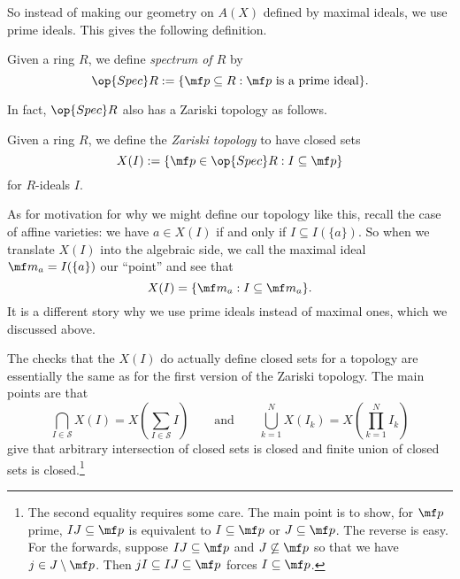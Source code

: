 \documentclass[../notes.tex]{subfiles}
\begin{document}
So instead of making our geometry on $A(X)$ defined by maximal ideals, we use prime ideals. This gives the following definition.
\begin{definition}
	Given a ring $R$, we define \textit{spectrum of $R$} by
	\[\op{Spec}R:=\{\mf p\subseteq R:\mf p\text{ is a prime ideal}\}.\]
\end{definition}
In fact, $\op{Spec}R$ also has a Zariski topology as follows.
\begin{definition}
	Given a ring $R$, we define the \textit{Zariski topology} to have closed sets
	\[X(I):=\{\mf p\in\op{Spec}R:I\subseteq\mf p\}\]
	for $R$-ideals $I$.
\end{definition}
\begin{remark}[Nir]
	As for motivation for why we might define our topology like this, recall the case of affine varieties: we have $a\in X(I)$ if and only if $I\subseteq I(\{a\})$. So when we translate $X(I)$ into the algebraic side, we call the maximal ideal $\mf m_a=I(\{a\})$ our ``point'' and see that
	\[X(I)=\{\mf m_a:I\subseteq\mf m_a\}.\]
	It is a different story why we use prime ideals instead of maximal ones, which we discussed above.
\end{remark}
The checks that the $X(I)$ do actually define closed sets for a topology are essentially the same as for the first version of the Zariski topology. The main points are that
\[\bigcap_{I\in\mathcal S}X(I)=X\left(\sum_{I\in\mathcal S}I\right)\qquad\text{and}\qquad\bigcup_{k=1}^NX(I_k)=X\left(\prod_{k=1}^NI_k\right)\]
give that arbitrary intersection of closed sets is closed and finite union of closed sets is closed.\footnote{The second equality requires some care. The main point is to show, for $\mf p$ prime, $IJ\subseteq\mf p$ is equivalent to $I\subseteq\mf p$ or $J\subseteq\mf p$. The reverse is easy. For the forwards, suppose $IJ\subseteq\mf p$ and $J\not\subseteq\mf p$ so that we have $j\in J\setminus\mf p$. Then $jI\subseteq IJ\subseteq\mf p$ forces $I\subseteq\mf p$.}
\end{document}
